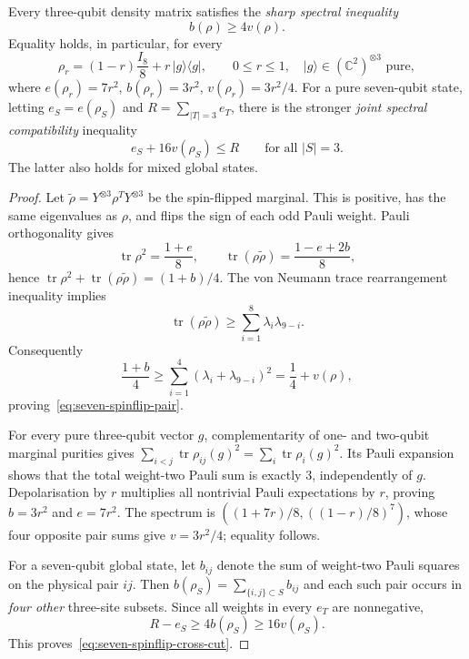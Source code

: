 \begin{proposition}
\label{prop:seven-spinflip-spectral-pair}
Every three-qubit density matrix satisfies the
\emph{sharp spectral inequality}
\begin{equation}\label{eq:seven-spinflip-pair}
 \boxed{\qquad b(\rho)\ge4v(\rho).\qquad}
\end{equation}
Equality holds, in particular, for every
\[
 \rho_r=(1-r)\frac{I_8}{8}+r\,|g\rangle\langle g|,
 \qquad 0\le r\le1,\quad |g\rangle\in(\mathbb C^2)^{\otimes3}
 \text{ pure},
\]
where \(e(\rho_r)=7r^2\),
\(b(\rho_r)=3r^2\), \(v(\rho_r)=3r^2/4\).
For a pure seven-qubit state, letting \(e_S=e(\rho_S)\)
and \(R=\sum_{|T|=3}e_T\), there is the stronger
\emph{joint spectral compatibility} inequality
\begin{equation}\label{eq:seven-spinflip-cross-cut}
 \boxed{\qquad e_S+16v(\rho_S)\le R
       \qquad\text{for all }|S|=3.\qquad}
\end{equation}
The latter also holds for mixed global states.
\end{proposition}
\begin{proof}
Let \(\widetilde\rho=Y^{\otimes3}\rho^T Y^{\otimes3}\)
be the spin-flipped marginal. This is positive,
has the same eigenvalues as \(\rho\), and flips the
sign of each odd Pauli weight. Pauli orthogonality gives
\[
 \operatorname{tr}\rho^2=\frac{1+e}{8},\qquad
 \operatorname{tr}(\rho\widetilde\rho)
      =\frac{1-e+2b}{8},
\]
hence
\(\operatorname{tr}\rho^2+
  \operatorname{tr}(\rho\widetilde\rho)=(1+b)/4\).
The von Neumann trace rearrangement inequality implies
\[
 \operatorname{tr}(\rho\widetilde\rho)
   \ge\sum_{i=1}^8\lambda_i\lambda_{9-i}.
\]
Consequently
\[
 \frac{1+b}{4}\ge
 \sum_{i=1}^4(\lambda_i+\lambda_{9-i})^2
 =\frac14+v(\rho),
\]
proving~\eqref{eq:seven-spinflip-pair}.

For every pure three-qubit vector \(g\), complementarity
of one- and two-qubit marginal purities gives
\(\sum_{i<j}\operatorname{tr}\rho_{ij}(g)^2
 =\sum_i\operatorname{tr}\rho_i(g)^2\).
Its Pauli expansion shows that the total weight-two
Pauli sum is exactly \(3\), independently of \(g\).
Depolarisation by \(r\) multiplies all nontrivial
Pauli expectations by \(r\), proving \(b=3r^2\)
and \(e=7r^2\). The spectrum is
\(((1+7r)/8,((1-r)/8)^7)\), whose four opposite
pair sums give \(v=3r^2/4\); equality follows.

For a seven-qubit global state, let
\(b_{ij}\) denote the sum of weight-two Pauli
squares on the physical pair \(ij\). Then
\(b(\rho_S)=\sum_{\{i,j\}\subset S}b_{ij}\)
and each such pair occurs in \emph{four other}
three-site subsets. Since all weights in every
\(e_T\) are nonnegative,
\[
 R-e_S\ge4b(\rho_S)\ge16v(\rho_S).
\]
This proves~\eqref{eq:seven-spinflip-cross-cut}.
\end{proof}

